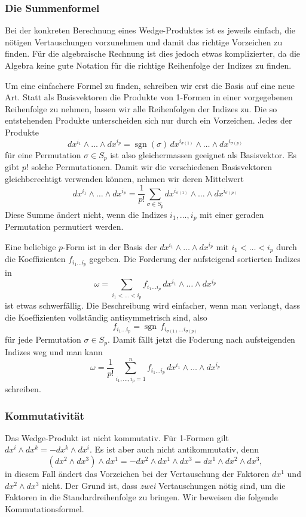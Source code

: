 %
%
\subsubsection{Die Summenformel}
Bei der konkreten Berechnung eines Wedge-Produktes ist es jeweils
einfach, die nötigen Vertauschungen vorzunehmen und damit das
richtige Vorzeichen zu finden.
Für die algebraische Rechnung ist dies jedoch etwas komplizierter,
da die Algebra keine gute Notation für die richtige Reihenfolge der
Indizes zu finden.

Um eine einfachere Formel zu finden, schreiben wir erst die Basis
auf eine neue Art.
Statt als Basisvektoren die Produkte von 1-Formen in einer vorgegebenen
Reihenfolge zu nehmen, lassen wir alle Reihenfolgen der Indizes zu.
Die so entstehenden Produkte unterscheiden sich nur durch ein
Vorzeichen.
Jedes der Produkte
\[
dx^{i_1}\wedge\dots\wedge dx^{i_p}
=
\operatorname{sgn}(\sigma)
\,
dx^{i_{\sigma(1)}} \wedge\dots\wedge dx^{i_{\sigma(p)}}
\]
für eine Permutation $\sigma\in S_p$ ist also gleichermassen geeignet
als Basisvektor.
Es gibt $p!$ solche Permutationen.
Damit wir die verschiedenen Basisvektoren gleichberechtigt verwenden
können, nehmen wir deren Mittelwert
\[
dx^{i_1}\wedge\dots\wedge dx^{i_p}
=
\frac{1}{p!}
\sum_{\sigma\in S_p} dx^{i_{\sigma(1)}} \wedge\dots\wedge dx^{i_{\sigma(p)}}
\]
Diese Summe ändert nicht, wenn die Indizes $i_1,\dots,i_p$ mit einer
geraden Permutation permutiert werden.

Eine beliebige $p$-Form ist in der Basis der
$dx^{i_1}\wedge\dots\wedge dx^{i_p}$  mit $i_1<\dots<i_p$
durch die Koeffizienten $f_{i_1\dots i_p}$ gegeben.
Die Forderung der aufsteigend sortierten Indizes in
\[
\omega
=
\sum_{i_1<\dots<i_p}
f_{i_1\dots i_p}\,
dx^{i_1}\wedge\dots\wedge dx^{i_p}
\]
ist etwas schwerfällig.
Die Beschreibung wird einfacher, wenn man verlangt, dass die
Koeffizienten vollständig antisymmetrisch sind, also
\[
f_{i_1\dots i_p}
=
\operatorname{sgn}\,
f_{i_{\sigma(1)}\dots i_{\sigma(p)}}
\]
für jede Permutation $\sigma\in S_p$.
Damit fällt jetzt die Foderung nach aufsteigenden Indizes weg und man
kann
\begin{equation}
\omega
=
\frac{1}{p!}
\sum_{i_1,\dots,i_p=1}^n
f_{i_1\dots i_p}
\,
dx^{i_1}\wedge\dots\wedge dx^{i_p}
\label{buch:pformen:pformen:eqn:summenformel}
\end{equation}
schreiben.

%
%
\subsubsection{Kommutativität}
Das Wedge-Produkt ist nicht kommutativ.
Für 1-Formen gilt $dx^i\wedge dx^k=-dx^k\wedge dx^i$.
Es ist aber auch nicht antikommutativ, denn 
\[
(dx^2\wedge dx^3)\wedge dx^1
=
-dx^2\wedge dx^1\wedge dx^3
=
dx^1\wedge dx^2\wedge dx^3,
\]
in diesem Fall ändert das Vorzeichen bei der Vertauschung der
Faktoren $dx^1$ und $dx^2\wedge dx^3$ nicht.
Der Grund ist, dass {\em zwei} Vertauschungen nötig sind, um
die Faktoren in die Standardreihenfolge zu bringen.
Wir beweisen die folgende Kommutationsformel.

